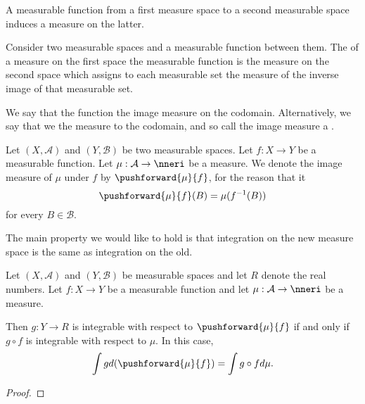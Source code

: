 
\sbasic



























\sstart
{}



A measurable
function from
a first measure space
to a second measurable space
induces a measure
on the latter.


Consider two measurable
spaces and a measurable
function between them.
The
of a measure on the first space
the measurable function
is the measure on the second space
which assigns to each measurable set
the measure of the inverse image of
that measurable set.

We say that the
function
the image measure
on the
codomain.
Alternatively,
we say that we
the measure to the
codomain, and so
call the image
measure
a
.


Let
$(X, \mathcal{A})$
and
$(Y, \mathcal{B})$
be two measurable spaces.
Let $f: X \to Y$ be
a measurable function.
Let
$\mu: \mathcal{A} \to \nneri$
be a measure.
We denote the
image measure of $\mu$
under $f$ by
$\pushforward{\mu}{f}$,
for the reason that it
\[
  \pushforward{\mu}{f}(B) = \mu(f^{-1}(B))
\]
for every $B \in \mathcal{B}$.


The main property
we would like to hold
is that integration
on the new measure space
is the same as integration
on the old.

\begin{prop}
  Let
  $(X, \mathcal{A})$
  and
  $(Y, \mathcal{B})$
  be measurable spaces
  and let $R$ denote
  the real numbers.
  Let $f: X \to Y$ be
  a measurable function
  and let
  $\mu: \mathcal{A} \to \nneri$
  be a measure.

  Then $g: Y \to R$
  is integrable with
  respect to
  $\pushforward{\mu}{f}$
  if and only if
  $g \circ f$
  is integrable with
  respect to
  $\mu$.
  In this case,
  \[
    \int g d(\pushforward{\mu}{f})
    =
    \int g \circ f d\mu.
  \]
  \begin{proof}
  \end{proof}
\end{prop}
\strats
